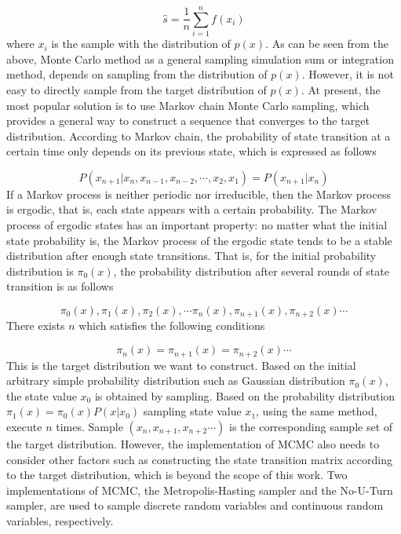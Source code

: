 \documentclass{svjour3}                     %
\begin{document}
\begin{equation}\label{eq_monte_carlo_3}
\hat s = \frac{1}{n}\sum\limits_{i = 1}^n {f({x_i})}
\end{equation}
where $x_i$ is the sample with the distribution of $p(x)$. As can be seen from the above, Monte Carlo method as a general sampling simulation sum or integration method, depends on sampling from the distribution of $p(x)$. However, it is not easy to directly sample from the target distribution of $p(x)$. At present, the most popular solution is to use Markov chain Monte Carlo sampling, which provides a general way to construct a sequence that converges to the target distribution. According to Markov chain, the probability of state transition at a certain time only depends on its previous state, which is expressed as follows

\begin{equation}\label{eq_markov_chain_1}
P({x_{n + 1}}\left| {{x_n},{x_{n - 1}}} \right.,{x_{n - 2}}, \cdots ,{x_2},{x_1}) = P({x_{n + 1}}\left| {{x_n}} \right.)
\end{equation}
If a Markov process is neither periodic nor irreducible, then the Markov process is ergodic, that is, each state appears with a certain probability. The Markov process of ergodic states has an important property: no matter what the initial state probability is, the Markov process of the ergodic state tends to be a stable distribution after enough state transitions.
That is, for the initial probability distribution is $\pi_0(x)$, the probability distribution after several rounds of state transition is as follows

\begin{equation}\label{eq_markov_chain_2}
\pi_{0}(x),\pi_{1}(x),\pi_{2}(x),\cdots \pi_{n}(x),\pi_{n+1}(x),\pi_{n+2}(x)\cdots
\end{equation}
There exists $n$ which satisfies the following conditions

\begin{equation}\label{eq_markov_chain_3}
\pi_{n}(x)=\pi_{n+1}(x)=\pi_{n+2}(x)\cdots
\end{equation}
This is the target distribution we want to construct. Based on the initial arbitrary simple probability distribution such as Gaussian distribution $\pi_{0}(x)$, the state value $x_0$ is obtained by sampling. Based on the probability distribution $\pi_{1}(x)=\pi_{0}(x)P(x\left| {{x_0}} \right.)$ sampling state value $x_1$, using the same method, execute $n$ times. Sample $(x_{n},x_{n+1},x_{n+2}\cdots)$ is the corresponding sample set of the target distribution. However, the implementation of MCMC also needs to consider other factors such as constructing the state transition matrix according to the target distribution, which is beyond the scope of this work. Two implementations of MCMC,  the Metropolis-Hasting sampler\citep{chib1995understanding} and the No-U-Turn sampler\citep{hoffman2014no}, are used to sample discrete random variables and continuous random variables, respectively.
\end{document}
